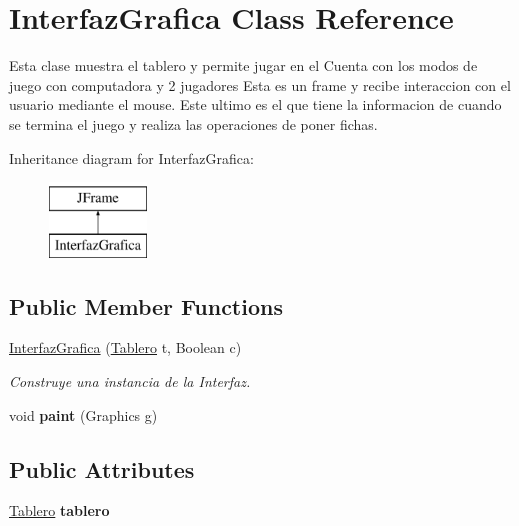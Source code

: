 \hypertarget{class_interfaz_grafica}{}\section{Interfaz\+Grafica Class Reference}
\label{class_interfaz_grafica}


Esta clase muestra el tablero y permite jugar en el Cuenta con los modos de juego con computadora y 2 jugadores Esta es un frame y recibe interaccion con el usuario mediante el mouse. Este ultimo es el que tiene la informacion de cuando se termina el juego y realiza las operaciones de poner fichas.  


Inheritance diagram for Interfaz\+Grafica\+:\begin{figure}[H]
\begin{center}
\leavevmode
\includegraphics[height=2.000000cm]{class_interfaz_grafica}
\end{center}
\end{figure}
\subsection*{Public Member Functions}
\begin{DoxyCompactItemize}
\item 
\mbox{\hyperlink{class_interfaz_grafica_a3ab695965d5886c0257148cab68974d9}{Interfaz\+Grafica}} (\mbox{\hyperlink{class_tablero}{Tablero}} t, Boolean c)
\begin{DoxyCompactList}\small\item\em Construye una instancia de la Interfaz. \end{DoxyCompactList}\item 
\mbox{\label{class_interfaz_grafica_a7b11c3ed50300568a847fa6889939b37}} 
void {\bfseries paint} (Graphics g)
\end{DoxyCompactItemize}
\subsection*{Public Attributes}
\begin{DoxyCompactItemize}
\item 
\mbox{\label{class_interfaz_grafica_a365ee1e5e4b4dc9a22a93dd4641151bc}} 
\mbox{\hyperlink{class_tablero}{Tablero}} {\bfseries tablero}
\end{DoxyCompactItemize}


